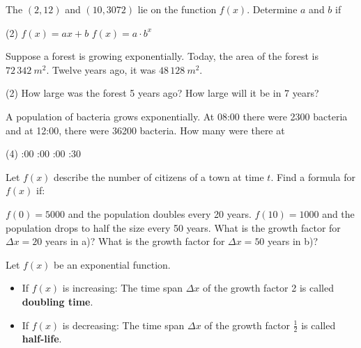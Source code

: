 \begin{exercise}
	The $\left(2,12\right)$ and $\left(10,3072\right)$ lie on the function $f\left(x\right)$.
	Determine $a$ and $b$ if
	\begin{tasks}(2)
		\task $f\left(x\right)=ax+b$
		\task $f\left(x\right)=a\cdot b^x$
	\end{tasks}
\end{exercise}
\pagebreak
\begin{exercise}
	Suppose a forest is growing exponentially.
	Today, the area of the forest is $72\,342\ m^2$.
	Twelve years ago, it was $48\,128\ m^2$.
	\begin{tasks}(2)
		\task How large was the forest 5 years ago?
		\task How large will it be in 7 years?
	\end{tasks}
\end{exercise}
\begin{exercise}
	A population of bacteria grows exponentially.
	At 08:00 there were 2300 bacteria and at 12:00, there were 36200 bacteria.
	How many were there at
	\begin{tasks}(4)
		:00
		:00
		:00
		:30
	\end{tasks}
\end{exercise}
\begin{exercise}
	Let $f\left(x\right)$ describe the number of citizens of a town at time $t$.
	Find a formula for $f\left(x\right)$ if:
	\begin{tasks}
		\task $f\left(0\right)=5000$ and the population doubles every 20 years.
		\task $f\left(10\right)=1000$ and the population drops to half the size every 50 years.
		\task What is the growth factor for $\Delta x=20$ years in a)?
		\task What is the growth factor for $\Delta x=50$ years in b)?
	\end{tasks}
\end{exercise}
\begin{definition*}
	Let $f\left(x\right)$ be an exponential function.
	\begin{itemize}
		\item If $f\left(x\right)$ is increasing: The time span $\Delta x$ of the growth factor 2 is called \textbf{doubling time}.
		\item If $f\left(x\right)$ is decreasing: The time span $\Delta x$ of the growth factor $\frac{1}{2}$ is called \textbf{half-life}.
	\end{itemize}
\end{definition*}
